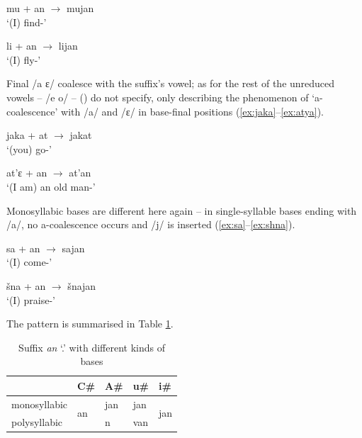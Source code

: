 \documentclass[a4paper, 12pt]{article}
\newcommand{\citeay}[2][]{\citeauthor{#2} (\citeyear[#1]{#2})}
\begin{document}
\begin{minipage}[t]{.45\linewidth}
\ex\label{ex:mu}
	mu + an $\rightarrow$ mujan \\`(I) find-{\Fsg}' 
\xe
\end{minipage}
\hfill
\begin{minipage}[t]{.45\linewidth}
\ex\label{ex:li}
	li + an $\rightarrow$ lijan \\`(I) fly-{\Fsg}' 
\xe
\end{minipage}	

	\noindent Final /a ɛ/ coalesce with the suffix's vowel; as for the rest of the unreduced vowels -- /e o/ -- \citeay{kozlov2018} do not specify, only describing the phenomenon of `a-coalescence' with /a/ and /ɛ/ in base-final positions (\ref{ex:jaka}--\ref{ex:atya}). 
	
\begin{minipage}[t]{.45\linewidth}
\ex\label{ex:jaka}
	jaka + at $\rightarrow$ jakat \\`(you) go-{\Ssg}'
\xe
\end{minipage}
\hfill
\begin{minipage}[t]{.45\linewidth}
\ex\label{ex:atya}
	at'ɛ + an $\rightarrow$ at'an \\`(I am) an old man-{\Fsg}' 
\xe
\end{minipage}	

	\noindent Monosyllabic bases are different here again -- in single-syllable bases ending with /a/, no a-coalescence occurs and /j/ is inserted (\ref{ex:sa}--\ref{ex:shna}).
	
\begin{minipage}[t]{.45\linewidth}
\ex\label{ex:sa}
	sa + an $\rightarrow$ sajan \\`(I) come-{\Fsg}'
\xe
\end{minipage}
\hfill
\begin{minipage}[t]{.45\linewidth}
\ex\label{ex:shna}
	šna + an $\rightarrow$ šnajan \\`(I) praise-{\Fsg}'
\xe
\end{minipage}	

	The pattern is summarised in Table \ref{tab:glidesan}.
	
\begin{table}[H]
\centering
\begin{tabular}{lllll}
\toprule
              & C\#                 & A\# & u\# & i\#                  \\
\midrule
monosyllabic  & \multirow{2}{*}{an} & jan & jan & \multirow{2}{*}{jan} \\
polysyllabic &                     & n   & van &                     \\
\bottomrule
\end{tabular}
\caption{Suffix \emph{an} `{\Npst}.{\Fsg}' with different kinds of bases}
\label{tab:glidesan}
\end{table}
\end{document}
